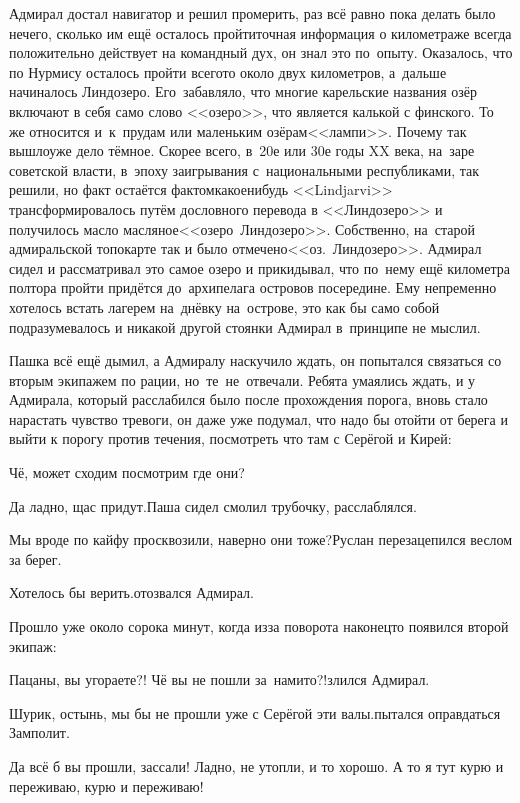 Адмирал достал навигатор и решил промерить, раз всё равно пока делать было нечего, сколько им ещё осталось пройти\mdash точная информация о километраже всегда положительно действует на командный дух, он знал это по~опыту. Оказалось, что по Нурмису осталось пройти всего\sdash то около двух километров, а~дальше начиналось Линдозеро. Его~забавляло, что многие карельские названия озёр включают в себя само слово <<озеро>>, что является калькой с финского. То же относится и~к~прудам или маленьким озёрам\mdash <<лампи>>. Почему так вышло\mdash уже дело тёмное. Скорее всего, в~20\sdash е или 30\sdash е годы XX века, на~заре советской власти, в~эпоху заигрывания с~национальными республиками, так решили, но факт остаётся фактом\mdash какое\sdash нибудь <<Lindjarvi>> трансформировалось путём дословного перевода в <<Линдозеро>> и получилось масло масляное\mdash <<озеро~Линдозеро>>. Собственно, на~старой адмиральской топокарте так и было отмечено\mdash <<оз.~Линдозеро>>. Адмирал сидел и рассматривал это самое озеро и прикидывал, что по~нему ещё километра полтора пройти придётся до~архипелага островов посередине. Ему непременно хотелось встать лагерем на~днёвку на~острове, это как бы само собой подразумевалось и никакой другой стоянки Адмирал в~принципе не мыслил.

Пашка всё ещё дымил, а Адмиралу наскучило ждать, он попытался связаться со вторым экипажем по рации, но~те~не~отвечали. Ребята умаялись ждать, и у Адмирала, который расслабился было после прохождения порога, вновь стало нарастать чувство тревоги, он даже уже подумал, что надо бы отойти от берега и выйти к порогу против течения, посмотреть что там с Серёгой и Кирей:

\diagdash Чё, может сходим посмотрим где они?

\diagdash Да ладно, щас придут.\mdash Паша сидел смолил трубочку, расслаблялся.

\diagdash Мы вроде по кайфу просквозили, наверно они тоже?\mdash Руслан перезацепился веслом за берег.

\diagdash Хотелось бы верить.\mdash отозвался Адмирал.

Прошло уже около сорока минут, когда из\sdash за поворота наконец\sdash то появился второй экипаж:

\diagdash Пацаны, вы угораете?! Чё вы не пошли за~нами\sdash то?!\mdash злился Адмирал.

\diagdash Шурик, остынь, мы бы не прошли уже с Серёгой эти валы.\mdash пытался оправдаться Замполит.

\diagdash Да всё б вы прошли, зассали! Ладно, не утопли, и то хорошо. А то я тут курю и переживаю, курю и переживаю!

